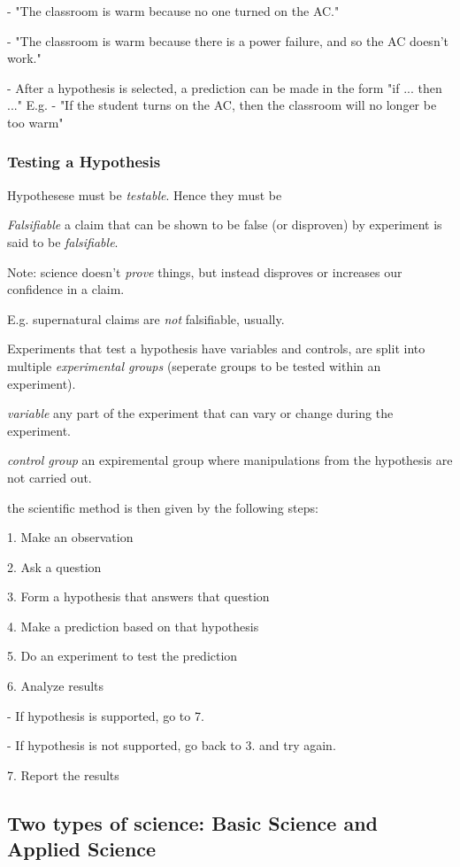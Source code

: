 \documentclass{article}
\theoremstyle{definition}
\begin{document}
\indent\indent - "The classroom is warm because no one turned on the AC."

\indent\indent	- "The classroom is warm because there is a power failure, and so the AC doesn't work."

- After a hypothesis is selected, a prediction can be made in the form "if ... then ..." E.g.
\indent\indent - "If the student turns on the AC, then the classroom will no longer be too warm"

\subsubsection{Testing a Hypothesis}
Hypothesese must be \textit{testable}. Hence they must be

 \textit{Falsifiable}
a claim that can be shown to be false (or disproven) by experiment is said to be \textit{falsifiable}.

Note: science doesn't \textit{prove} things, but instead disproves or increases our confidence in a claim.

E.g. supernatural claims are \textit{not} falsifiable, usually.

Experiments that test a hypothesis have variables and controls, are split into multiple \textit{experimental groups} (seperate groups to be tested within an experiment).

 \textit{variable} any part of the experiment that can vary or change during the experiment.

 \textit{control group} an expiremental group where manipulations from the hypothesis are not carried out.


the scientific method is then given by the following steps:

1. Make an observation

2. Ask a question

3. Form a hypothesis that answers that question

4. Make a prediction based on that hypothesis

5. Do an experiment to test the prediction

6. Analyze results

\indent\indent- If hypothesis is supported, go to 7.

\indent\indent- If hypothesis is not supported, go back to 3. and try again.

7. Report the results

\subsection{Two types of science: Basic Science and Applied Science}
\end{document}
